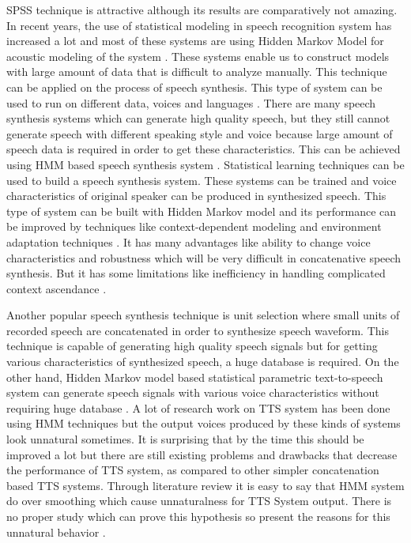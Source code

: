 SPSS technique is attractive although its results are comparatively not amazing. In recent years,
the use of statistical modeling in speech recognition system has increased a lot and most of these
systems are using Hidden Markov Model for acoustic modeling of the system \cite{donovan1999hidden}. These systems enable us to construct models with large amount of data that is difficult to analyze manually. This technique can be applied on the process of speech synthesis. This type of system can be used to run on different data, voices and languages \cite{donovan1999hidden}. There are many speech synthesis systems which can generate high quality speech, but they still cannot generate speech with different speaking style and voice because large amount of speech data is required in order to get these characteristics. This can be achieved using HMM based speech synthesis system \cite{tokuda2002hmm}. Statistical learning techniques can be used to build a speech synthesis system. These systems can be trained and voice characteristics of original speaker can be produced in synthesized speech. This type of system can be built with Hidden Markov model and its performance can be improved by techniques like context-dependent modeling and environment adaptation techniques \cite{tokuda2000speech}. It has many advantages like ability to change voice characteristics and robustness which will be very difficult in concatenative speech synthesis. But it has some limitations like inefficiency in handling complicated context ascendance \cite{ze2013statistical}.

Another popular speech synthesis technique is unit selection where small units of recorded speech are concatenated in order to synthesize speech waveform. This technique is capable of generating high quality speech signals but for getting various characteristics of synthesized speech, a huge database is required. On the other hand, Hidden Markov model based statistical parametric text-to-speech system can generate speech signals with various voice characteristics without requiring huge database \cite{zen2007hmm}. A lot of research work on TTS system has been done using HMM techniques but the output voices produced by these kinds of systems look unnatural sometimes. It is surprising that by the time this should be improved a lot but there are still existing problems and drawbacks that decrease the performance of TTS system, as compared to other simpler concatenation based TTS systems. Through literature review it is easy to say that HMM system do over smoothing which cause unnaturalness for TTS System output. There is no proper study which can prove this hypothesis so \cite{merritt2013investigating} present the reasons for this unnatural behavior \cite{merritt2013investigating}.

